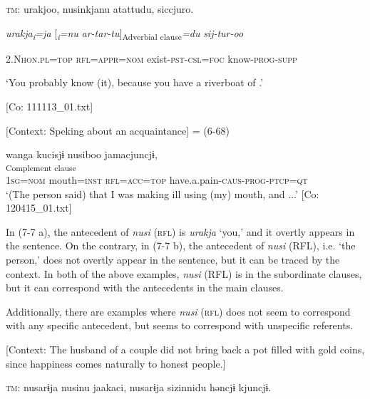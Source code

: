     \textsc{tm}:  urakjoo,  nusinkjanu  atattudu,   siccjuro.

      \textit{urakja\textsubscript{i}}\textit{=ja}  [\textit{\textsubscript{i}}\textit{=nu}  \textit{ar-tar-tu}]\textsubscript{Adverbial clause}\textit{=du}  \textit{sij-tur-oo}
                                                                                                                                                                      
      2.N\textsc{hon}.\textsc{pl}=\textsc{top}  \textsc{rfl}=\textsc{appr}=\textsc{nom}  exist-\textsc{pst}-\textsc{csl}=\textsc{foc}   know-\textsc{prog}-\textsc{supp}

      ‘You probably know (it), because you have a riverboat of .’

      [Co: 111113\_01.txt]

  \ex\label{ex:7:7b}  [Context: Speking about an acquaintance] = (6-68)

\glll  wanga  kucisjɨ  nusiboo  jamacjuncjɨ,\\
[\textit{wan=ga}  \textit{kuci=sjɨ}  \textit{\Highlight{nusi}=ba=ja}  \textit{jam-as-tur-n=ccjɨ}]\textsubscript{Complement clause}\\
1\textsc{sg}=\textsc{nom}  mouth=\textsc{inst}  \textsc{rfl}=\textsc{acc}=\textsc{top}  have.a.pain-\textsc{caus}-\textsc{prog}-\textsc{ptcp}=\textsc{qt}\\
\glt ‘(The person said) that I was making \textit{\textsubscript{} }ill using (my) mouth, and ...’ [Co: 120415\_01.txt]
\z
\z

In (7-7 a), the antecedent of \textit{nusi} (\textsc{rfl}) is \textit{urakja} ‘you,’ and it overtly appears in the sentence. On the contrary, in (7-7 b), the antecedent of \textit{nusi} (RFL), i.e. ‘the person,’ does not overtly appear in the sentence, but it can be traced by the context. In both of the above examples, \textit{nusi} (RFL) is in the subordinate clauses, but it can correspond with the antecedents in the main clauses.

  Additionally, there are examples where \textit{nusi} (\textsc{rfl}) does not seem to correspond with any specific antecedent, but seems to correspond with unspecific referents.

\ea \label{ex:7:8}  [Context: The husband of a couple did not bring back a pot filled with gold coins, since happiness comes naturally to honest people.]

  \textsc{tm}:  nusarɨja  nusinu  jaakaci,  nusarɨja  sizinnidu   həncjɨ  kjuncjɨ.


